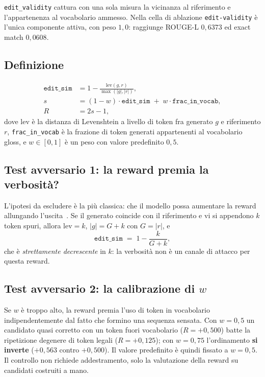 \texttt{edit\_validity} cattura con una sola misura la vicinanza al riferimento
e l'appartenenza al vocabolario ammesso. Nella cella di ablazione
\texttt{edit-validity} è l'unica componente attiva, con peso $1{,}0$: raggiunge
ROUGE-L $0{,}6373$ ed exact match $0{,}0608$.

\subsection{Definizione}

\begin{align}
  \label{eq:edit-sim}
  \texttt{edit\_sim} &= 1 - \frac{\mathrm{lev}(g, r)}{\max(|g|, |r|)}, \\
  \label{eq:edit-mix}
  s &= (1 - w)\cdot \texttt{edit\_sim} \;+\; w \cdot \texttt{frac\_in\_vocab}, \\
  \label{eq:edit-reward}
  R &= 2s - 1,
\end{align}
dove $\mathrm{lev}$ è la distanza di Levenshtein a livello di token fra generato
$g$ e riferimento $r$, \texttt{frac\_in\_vocab} è la frazione di token generati
appartenenti al vocabolario gloss, e $w \in [0,1]$ è un peso con valore
predefinito $0{,}5$.

\subsection{Test avversario 1: la reward premia la verbosità?}

L'ipotesi da escludere è la più classica: che il modello possa aumentare la
reward allungando l'uscita~\cite{singhal2023length}. Se il generato coincide con
il riferimento e vi si appendono $k$ token spuri, allora $\mathrm{lev} = k$,
$|g| = G + k$ con $G = |r|$, e
\begin{equation}
  \label{eq:append-k}
  \texttt{edit\_sim} \;=\; 1 - \frac{k}{G + k},
\end{equation}
che è \emph{strettamente decrescente} in $k$: la verbosità non è un canale di
attacco per questa reward.

\subsection{Test avversario 2: la calibrazione di $w$}

Se $w$ è troppo alto, la reward premia l'uso di token in vocabolario
indipendentemente dal fatto che formino una sequenza sensata. Con $w=0{,}5$ un
candidato quasi corretto con un token fuori vocabolario ($R=+0{,}500$) batte la
ripetizione degenere di token legali ($R=+0{,}125$); con $w=0{,}75$ l'ordinamento
\textbf{si inverte} ($+0{,}563$ contro $+0{,}500$). Il valore predefinito è
quindi fissato a $w=0{,}5$. Il controllo non richiede addestramento, solo la
valutazione della reward su candidati costruiti a mano.
